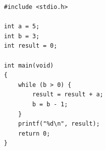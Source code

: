 \begin{lstlisting}[style=csrc]
#include <stdio.h>

int a = 5;
int b = 3;
int result = 0;

int main(void)
{
    while (b > 0) {
        result = result + a;
        b = b - 1;
    }
    printf("%d\n", result);
    return 0;
}
\end{lstlisting}

